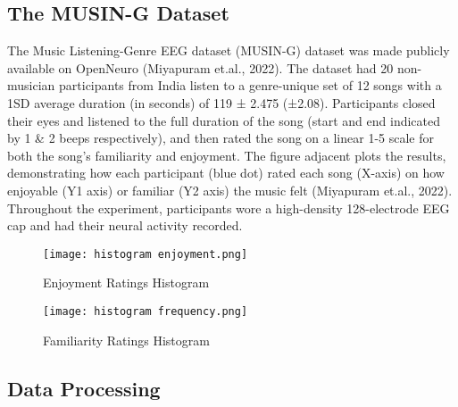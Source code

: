\documentclass[fleqn,10pt]{SelfArx} %
\begin{document}
\flushleft\subsection{The MUSIN-G Dataset}
\justifying
The Music Listening-Genre EEG dataset (MUSIN-G)  dataset was made publicly available on OpenNeuro (Miyapuram et.al., 2022). The dataset had 20 non-musician participants from India listen to a genre-unique set of 12 songs with a 1SD average duration (in seconds) of 119 ± 2.475 (±2.08).  Participants closed their eyes and listened to the full duration of the song (start and end indicated by 1 \& 2 beeps respectively), and then rated the song on a linear 1-5 scale for both the song’s familiarity and enjoyment. The figure adjacent plots the results, demonstrating how each participant (blue dot) rated each song (X-axis) on how enjoyable (Y1 axis) or familiar (Y2 axis) the music felt (Miyapuram et.al., 2022). Throughout the experiment, participants wore a high-density 128-electrode EEG cap and had their neural activity recorded.
\begin{figure}
    \centering
    \caption{Enjoyment Ratings Histogram}
    \texttt{[image: histogram enjoyment.png]}
    \label{fig:enjoy_hist}
\end{figure}
\begin{figure}
    \centering
    \texttt{[image: histogram frequency.png]}
    \caption{Familiarity Ratings Histogram}
    \label{fig:famil_hist}
\end{figure}
\subsection{Data Processing}
\end{document}
